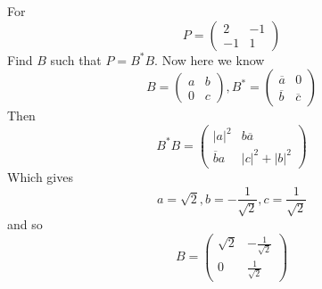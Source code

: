 \documentclass[12pt]{article}
\begin{document}
\begin{ex}
	For
	$$P = \begin{pmatrix} 2 & -1 \\ -1 & 1 \end{pmatrix}$$
	Find $B$ such that $P = B^*B$. Now here we know
	$$B = \begin{pmatrix} a & b \\ 0 & c \end{pmatrix}, B^* = \begin{pmatrix} \overline{a} & 0 \\ \overline{b} & \overline{c} \end{pmatrix}$$
	Then
	$$B^*B = \begin{pmatrix} |a|^2 & b\overline{a} \\ \overline{b}a & |c|^2+|b|^2 \end{pmatrix}$$
	Which gives
	$$a = \sqrt{2}, b = -\frac{1}{\sqrt{2}}, c = \frac{1}{\sqrt{2}}$$
	and so
	$$B = \begin{pmatrix} \sqrt{2} & -\frac{1}{\sqrt{2}} \\ 0 & \frac{1}{\sqrt{2}} \end{pmatrix}$$
\end{ex}
\end{document}
